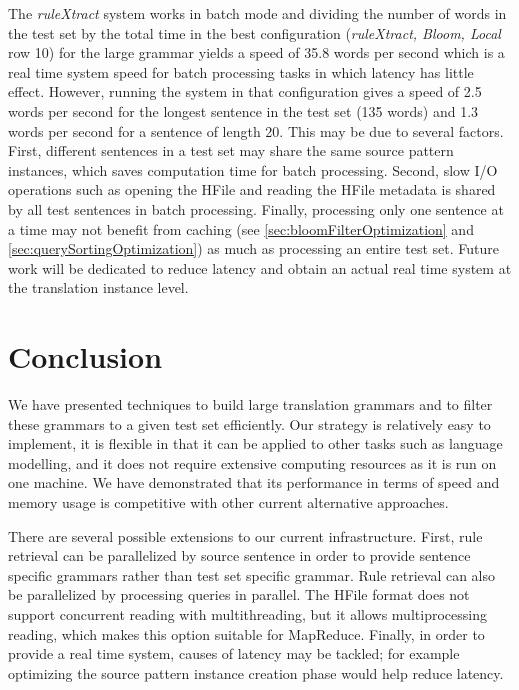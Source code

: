 The \emph{ruleXtract} system works in batch mode and dividing the number of
words in the test set by the total time in the best configuration
(\emph{ruleXtract, Bloom, Local} row 10) for the large grammar yields
a speed of 35.8
words per second which is a real time system speed for batch processing tasks in
which latency has little effect. However, running the system in that
configuration gives a speed of 2.5 words per second for the longest sentence in
the test set (135 words) and 1.3 words per second for a sentence of length 20.
This may be due to several factors.
First, different sentences in a test set may share the same source pattern
instances, which saves computation time for batch processing. Second,
slow I/O operations such as opening the HFile and reading the HFile metadata is shared
by all test sentences in batch processing. Finally, processing only one
sentence at a time may not benefit from caching
(see \autoref{sec:bloomFilterOptimization} and \autoref{sec:querySortingOptimization})
as much as processing an entire test set.
Future work will be dedicated to reduce latency and obtain an actual real time
system at the translation instance level.

\section{Conclusion}
\label{sec:conclusion}

We have presented techniques to build large translation
grammars and to filter these grammars to a given test set efficiently.
Our strategy is relatively easy to implement, it is
flexible in that it can be applied to other tasks such as language modelling,
and it does not require extensive computing resources as it is run on one
machine. We have demonstrated that its performance in terms of speed and memory
usage is competitive with other current alternative approaches.

There are several possible extensions to our current infrastructure.
First, rule retrieval can be parallelized by source sentence in order %
to provide sentence specific grammars rather than test set specific
grammar. Rule retrieval can also be parallelized by
processing queries in parallel. The HFile format does not support
concurrent reading with multithreading, but it allows multiprocessing
reading, which makes this option suitable for MapReduce.
Finally, in order to provide a real time system, causes of latency
may be tackled; for example optimizing the source pattern instance
creation phase would help reduce latency.
